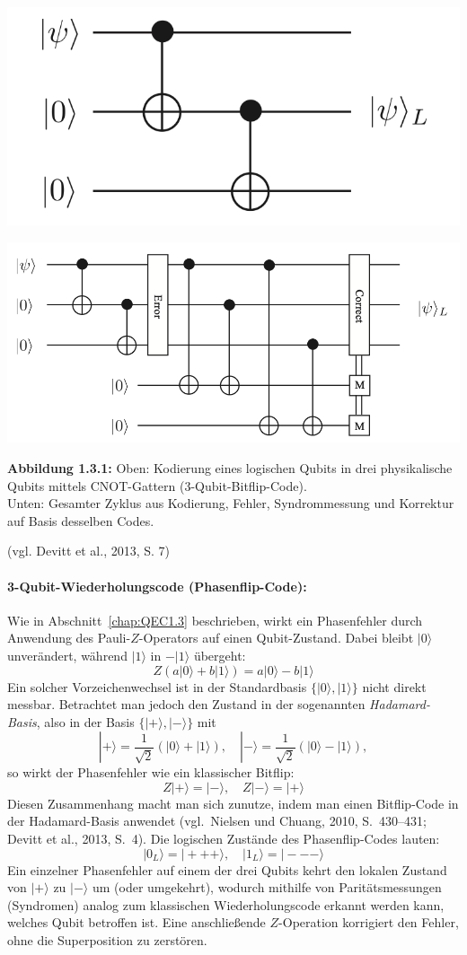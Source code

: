 \begin{center}
  \includegraphics[width=0.5\linewidth]{images/error-correction/Abb1_BitFlipCode_1.png}
  
  \vspace{1.5em}
  
  \includegraphics[width=0.5\linewidth]{images/error-correction/Abb2_BitFlipCode_2.png}
  
  \vspace{0.5em}
  
  \textbf{Abbildung 1.3.1:} Oben: Kodierung eines logischen Qubits in drei physikalische Qubits mittels CNOT-Gattern (3-Qubit-Bitflip-Code).\\
  Unten: Gesamter Zyklus aus Kodierung, Fehler, Syndrommessung und Korrektur auf Basis desselben Codes.
\end{center}
(vgl. Devitt et al., 2013, S. 7)

\paragraph{3-Qubit-Wiederholungscode (Phasenflip-Code):}\label{chap:QEC1.4}

Wie in Abschnitt~\ref{chap:QEC1.3} beschrieben, wirkt ein Phasenfehler durch Anwendung des Pauli-\(Z\)-Operators auf einen Qubit-Zustand. Dabei bleibt \(|0\rangle\) unverändert, während \(|1\rangle\) in \(-|1\rangle\) übergeht:
\[
Z(a|0\rangle + b|1\rangle) = a|0\rangle - b|1\rangle
\]
Ein solcher Vorzeichenwechsel ist in der Standardbasis \(\{|0\rangle, |1\rangle\}\) nicht direkt messbar. Betrachtet man jedoch den Zustand in der sogenannten \emph{Hadamard-Basis}, also in der Basis \(\{|+\rangle, |-\rangle\}\) mit
\[
|+\rangle = \frac{1}{\sqrt{2}}(|0\rangle + |1\rangle), \quad |-\rangle = \frac{1}{\sqrt{2}}(|0\rangle - |1\rangle),
\]
so wirkt der Phasenfehler wie ein klassischer Bitflip:
\[
Z|+\rangle = |-\rangle, \quad Z|-\rangle = |+\rangle
\]
Diesen Zusammenhang macht man sich zunutze, indem man einen Bitflip-Code in der Hadamard-Basis anwendet (vgl.\ Nielsen und Chuang, 2010, S.~430–431; Devitt et al., 2013, S.~4). Die logischen Zustände des Phasenflip-Codes lauten:
\[
|0_L\rangle = |+++\rangle, \quad |1_L\rangle = |---\rangle
\]
Ein einzelner Phasenfehler auf einem der drei Qubits kehrt den lokalen Zustand von \(|+\rangle\) zu \(|-\rangle\) um (oder umgekehrt), wodurch mithilfe von Paritätsmessungen (Syndromen) analog zum klassischen Wiederholungscode erkannt werden kann, welches Qubit betroffen ist. Eine anschließende \(Z\)-Operation korrigiert den Fehler, ohne die Superposition zu zerstören.\\

